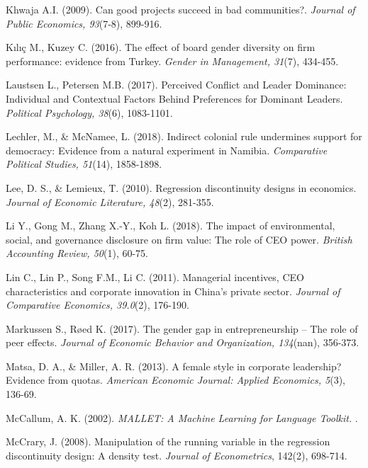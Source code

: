 \documentclass[english]{article}
\begin{document}
\begin{singlespace}
\begin{list}{}{\setlength\itemindent{-\leftmargin}}
\item *Khwaja A.I. (2009). Can good projects succeed in bad communities?.  \emph{Journal of Public Economics, 93}(7-8), 899-916.

\item *Kılıç M., Kuzey C. (2016). The effect of board gender diversity on firm performance: evidence from Turkey. \emph{Gender in Management, 31}(7), 434-455.

\item *Laustsen L., Petersen M.B. (2017). Perceived Conflict and Leader Dominance: Individual and Contextual Factors Behind Preferences for Dominant Leaders. \emph{Political Psychology, 38}(6), 1083-1101.

\item *Lechler, M., \& McNamee, L. (2018). Indirect colonial rule undermines support for democracy: Evidence from a natural experiment in Namibia. \emph{Comparative Political Studies, 51}(14), 1858-1898.

\item Lee, D. S., \& Lemieux, T. (2010). Regression discontinuity designs in economics. \emph{Journal of Economic Literature, 48}(2), 281-355. 

\item *Li Y., Gong M., Zhang X.-Y., Koh L. (2018). The impact of environmental, social, and governance disclosure on firm value: The role of CEO power. \emph{British Accounting Review, 50}(1), 60-75.

\item *Lin C., Lin P., Song F.M., Li C. (2011). Managerial incentives, CEO characteristics and corporate innovation in China's private sector.  \emph{Journal of Comparative Economics, 39.0}(2), 176-190.

\item *Markussen S., Røed K. (2017). The gender gap in entrepreneurship -- The role of peer effects. \emph{Journal of Economic Behavior and Organization, 134}(nan), 356-373.

\item *Matsa, D. A., \& Miller, A. R. (2013). A female style in corporate leadership? Evidence from quotas. \emph{American Economic Journal: Applied Economics, 5}(3), 136-69.

\item McCallum, A. K. (2002). \emph{MALLET: A Machine Learning for Language Toolkit.} .

\item McCrary, J. (2008). Manipulation of the running variable in the regression discontinuity design: A density test. \emph{Journal of Econometrics}, 142(2), 698-714.


\end{list}
\end{singlespace}
\end{document}
